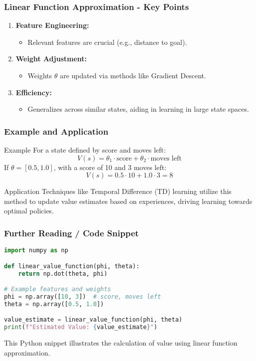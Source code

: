 \documentclass[aspectratio=169]{beamer}
\begin{document}
\begin{frame}[fragile]
    \frametitle{Linear Function Approximation - Key Points}
    \begin{enumerate}
        \item \textbf{Feature Engineering:}
            \begin{itemize}
                \item Relevant features are crucial (e.g., distance to goal).
            \end{itemize}
        \item \textbf{Weight Adjustment:}
            \begin{itemize}
                \item Weights $\theta$ are updated via methods like Gradient Descent.
            \end{itemize}
        \item \textbf{Efficiency:}
            \begin{itemize}
                \item Generalizes across similar states, aiding in learning in large state spaces.
            \end{itemize}
    \end{enumerate}
\end{frame}

\begin{frame}[fragile]
    \frametitle{Example and Application}
    \begin{block}{Example}
        For a state defined by score and moves left:
        \begin{equation}
            V(s) = \theta_1 \cdot \text{score} + \theta_2 \cdot \text{moves left}
        \end{equation}
        If $\theta = [0.5, 1.0]$, with a score of 10 and 3 moves left:
        \begin{equation}
            V(s) = 0.5 \cdot 10 + 1.0 \cdot 3 = 8
        \end{equation}
    \end{block}
    
    \begin{block}{Application}
        Techniques like Temporal Difference (TD) learning utilize this method to update value estimates based on experiences, driving learning towards optimal policies.
    \end{block}
\end{frame}

\begin{frame}[fragile]
    \frametitle{Further Reading / Code Snippet}
    \begin{lstlisting}[language=Python]
import numpy as np

def linear_value_function(phi, theta):
    return np.dot(theta, phi)

# Example features and weights
phi = np.array([10, 3])  # score, moves left
theta = np.array([0.5, 1.0])

value_estimate = linear_value_function(phi, theta)
print(f"Estimated Value: {value_estimate}")
    \end{lstlisting}
    This Python snippet illustrates the calculation of value using linear function approximation.
\end{frame}
\end{document}
